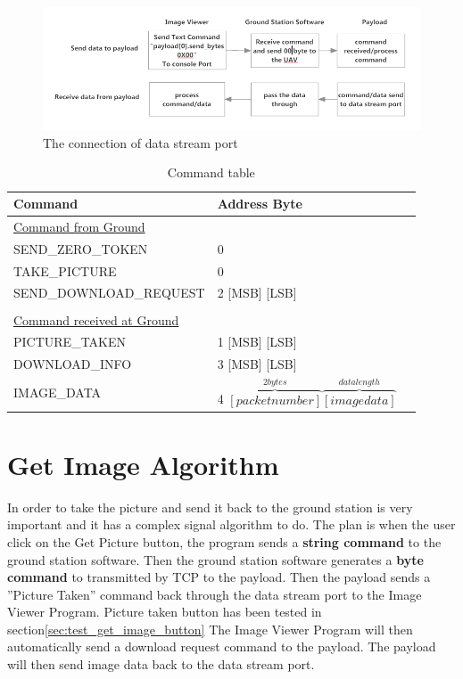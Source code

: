 \begin{figure}[H]
\begin{center}
\includegraphics[scale=0.6]{figures/GCS_Payload_communication.png} 
\caption{The connection of data stream port\label{GCS_Payload_comm}}
\end{center}
\end{figure}

\begin{table}[H]

\begin{center}
\begin{tabular}{l l @{.} l}
 Command&
\multicolumn{2}{l}{Address Byte } \\

\hline
\underline{Command from Ground} & \\
SEND\_ZERO\_TOKEN & 0 \\
TAKE\_PICTURE & 0 \\
SEND\_DOWNLOAD\_REQUEST & 2 [MSB] [LSB]  \\
\\
\underline{Command received at Ground}\\
PICTURE\_TAKEN & 1 [MSB] [LSB]\\
DOWNLOAD\_INFO & 3 [MSB] [LSB]\\
IMAGE\_DATA & 4 $\overbrace{ [packet number]}^{2bytes} \overbrace{[image data]}^{data length}$ \\
\end{tabular}
\caption{Command table\label{command_table}}
\end{center}
\end{table}

\section{Get Image Algorithm}
\label{get image algorithm}
In order to take the picture and send it back to the ground station is very important and it has a complex signal algorithm to do.
The plan is when the user click on the Get Picture button, the program sends a \textbf{string command} to the ground station software.
Then the ground station software generates a \textbf{byte command} to transmitted by TCP to the payload. 
Then the payload sends a ''Picture Taken'' command back through the data stream port to the Image Viewer Program. 
Picture taken button has been tested in section\ref{sec:test_get_image_button}
The Image Viewer Program will then automatically send a download request command to the payload. 
The payload will then send image data back to the data stream port. 

